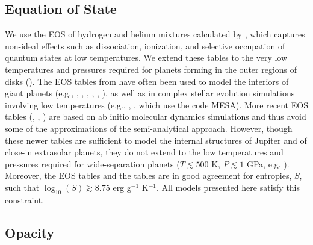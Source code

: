 \pagebreak

\subsection{Equation of State}
\label{sec:introeos}

We use the EOS of hydrogen and helium mixtures calculated by \citet{saumon95}, which captures non-ideal effects such as dissociation, ionization, and selective occupation of quantum states at low temperatures.  We extend these tables to the very low temperatures and pressures required for planets forming in the outer regions of disks ().
The EOS tables from \citet{saumon95} have often been used to model the interiors of giant planets (e.g., \citealt{pollack96}, \citealt{ikoma00}, \citealt{alibert05}, \citealt{hubickyj05}, \citealt{pn05}, \citealt{mordasini12}), as well as in complex stellar evolution simulations involving low temperatures (e.g., \citealt{paxton11}, \citealt{paxton13}, which use the code MESA). More recent EOS tables (\citealt{nettelmann08}, \citealt{nettelmann12}, \citealt{militzer13}) are based on ab initio molecular dynamics simulations and thus avoid some of the approximations of the \citet{saumon95} semi-analytical approach. However, though these newer tables are sufficient to model the internal structures of Jupiter and of close-in extrasolar planets,  they do not extend to the low temperatures and pressures required for wide-separation planets ($T \lesssim 500$ K, $P \lesssim 1$ GPa, e.g. \citealt{militzer13}). Moreover, the \citet{militzer13} EOS tables and the \citet{saumon95} tables are in good agreement for entropies, $S$, such that $\log_{10}(S) \gtrsim 8.75$ erg g$^{-1}$ K$^{-1}$.  All models presented here satisfy this constraint. 

\subsection{Opacity}
\label{sec:introopacity}


